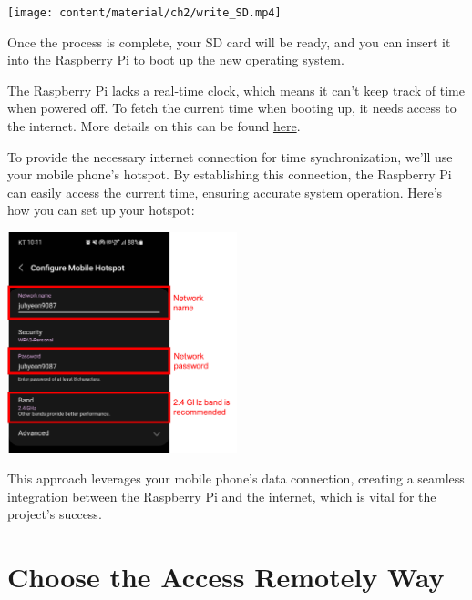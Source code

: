 \documentclass[
  letterpaper,
]{scrbook}
\begin{document}
\texttt{[image: content/material/ch2/write\_SD.mp4]}

Once the process is complete, your SD card will be ready, and you can
insert it into the Raspberry Pi to boot up the new operating system.

\begin{tcolorbox}[enhanced jigsaw, left=2mm, coltitle=black, colframe=quarto-callout-note-color-frame, bottomrule=.15mm, colback=white, bottomtitle=1mm, breakable, colbacktitle=quarto-callout-note-color!10!white, titlerule=0mm, toptitle=1mm, arc=.35mm, rightrule=.15mm, opacityback=0, title=\textcolor{quarto-callout-note-color}{\faInfo}\hspace{0.5em}{Why Do We Use Our Mobile Hotspot for This Project?}, toprule=.15mm, leftrule=.75mm, opacitybacktitle=0.6]

The Raspberry Pi lacks a real-time clock, which means it can't keep
track of time when powered off. To fetch the current time when booting
up, it needs access to the internet. More details on this can be found
\href{https://dayne.broderson.org/2020/03/12/the_time_is_now.html}{here}.

To provide the necessary internet connection for time synchronization,
we'll use your mobile phone's hotspot. By establishing this connection,
the Raspberry Pi can easily access the current time, ensuring accurate
system operation. Here's how you can set up your hotspot:

\includegraphics[width=0.5\textwidth,height=\textheight]{content/material/ch2/mobile_hotspot.png}

This approach leverages your mobile phone's data connection, creating a
seamless integration between the Raspberry Pi and the internet, which is
vital for the project's success.

\end{tcolorbox}

\hypertarget{choose-the-access-remotely-way}{%
\section{Choose the Access Remotely
Way}\label{choose-the-access-remotely-way}}
\end{document}

